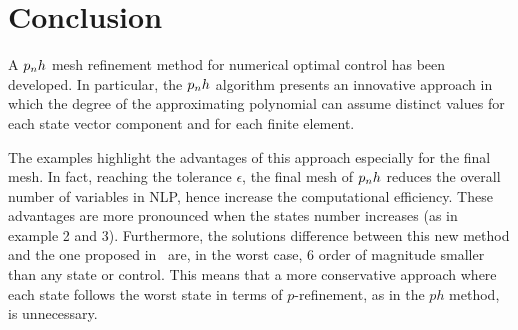 \section*{Conclusion}
A $p_{n}h$ mesh refinement method for numerical optimal control has been developed. In particular, the $p_{n}h$ algorithm presents an innovative approach in which the degree of the approximating polynomial can assume distinct values for each state vector component and for each finite element.

The examples highlight the advantages of this approach  especially for the final mesh. In fact, reaching the tolerance $\epsilon$, the final mesh of $p_{n}h$ reduces the overall number of variables in NLP, hence increase the computational efficiency. These advantages are more pronounced when the states number increases (as in example 2 and 3). 
Furthermore, the solutions difference between this new method and the one proposed in~\cite{Patterson:OCAM:2015} are, in the worst case, 6 order of magnitude smaller than any state or control. This means that a more conservative approach where each state follows the worst state in terms of $p$-refinement, as in the $ph$ method, is unnecessary.  